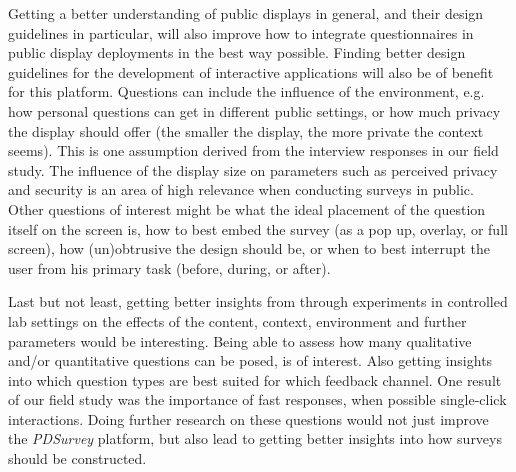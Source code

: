 Getting a better understanding of public displays in general, and their design guidelines in particular, will also improve how to integrate questionnaires in public display deployments in the best way possible. Finding better design guidelines for the development of interactive applications will also be of benefit for this platform. Questions can include the influence of the environment, e.g. how personal questions can get in different public settings, or how much privacy the display should offer (the smaller the display, the more private the context seems). This is one assumption derived from the interview responses in our field study. The influence of the display size on parameters such as perceived privacy and security is an area of high relevance when conducting surveys in public.
Other questions of interest might be what the ideal placement of the question itself on the screen is, how to best embed the survey (as a pop up, overlay, or full screen), how (un)obtrusive the design should be, or when to best interrupt the user from his primary task (before, during, or after).


Last but not least, getting better insights from through experiments in controlled lab settings on the effects of the content, context, environment and further parameters would be interesting. Being able to assess how many qualitative and/or quantitative questions can be posed, is of interest. Also getting insights into which question types are best suited for which feedback channel. One result of our field study was the importance of fast responses, when possible single-click interactions.
Doing further research on these questions would not just improve the \textit{PDSurvey} platform, but also lead to getting better insights into how surveys should be constructed.

